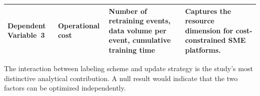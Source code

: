 \begin{table}[htbp]
\begin{threeparttable}[c]
\begin{tabular}{>{\raggedright\arraybackslash}p{2.1cm} >{\raggedright\arraybackslash}p{1.9cm} >{\raggedright\arraybackslash}p{4.6cm} >{\raggedright\arraybackslash}p{4.6cm}}
      Dependent Variable~3 & Operational cost &
        Number of retraining events, data volume per event, cumulative training time &
        Captures the resource dimension for cost-constrained SME platforms. \\
      \bottomrule
    \end{tabular}
    \begin{tablenotes}
      \footnotesize
      \item[a] The interaction between labeling scheme and update strategy is the study's most distinctive analytical contribution. A null result would indicate that the two factors can be optimized independently.
    \end{tablenotes}
  \end{threeparttable}
\end{table}

